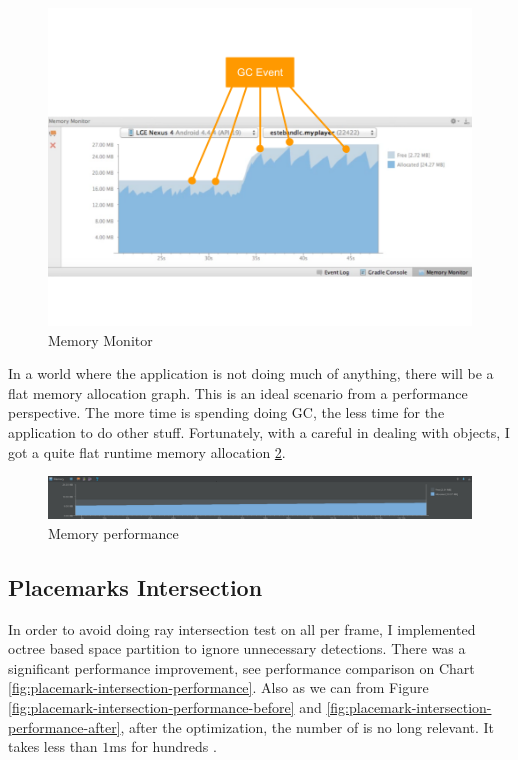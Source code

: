 \begin{figure}[H]
	\caption[Memory monitor]{Memory Monitor \cite{google.memory-monitor.2015}}
	\label{fig:memory-monitor}
	\centering
	\includegraphics[width=\textwidth, keepaspectratio]{Figures/memory-monitor.png}
	\decoRule
\end{figure}

In a world where the application is not doing much of anything, there will be a flat memory allocation graph. This is an ideal scenario from a performance perspective. The more time is spending doing GC, the less time for the application to do other stuff. Fortunately, with a careful in dealing with objects, I got a quite flat runtime memory allocation \ref{fig:memory-performance}.

\begin{figure}[H]
	\caption{Memory performance}
	\label{fig:memory-performance}
	\centering
	\includegraphics[width=\textwidth, keepaspectratio]{Figures/memory-performance.png}
	\decoRule
\end{figure}

\subsection{Placemarks Intersection}
\label{section:placemarks-intersection}

In order to avoid doing ray intersection test on all  per frame, I implemented octree based space partition to ignore unnecessary detections. There was a significant performance improvement, see performance comparison on Chart \ref{fig:placemark-intersection-performance}. Also as we can from Figure \ref{fig:placemark-intersection-performance-before} and \ref{fig:placemark-intersection-performance-after}, after the optimization, the number of  is no long relevant. It takes less than $1$ms for hundreds .

